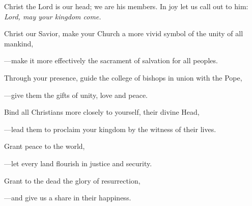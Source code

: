 \intercessions\indent

\begin{hangpar}

Christ the Lord is our head; we are his members. In joy let us call out to him:\\
\emph{Lord, may your kingdom come.}

\medskip Christ our Savior, make your Church a more vivid symbol of the unity of all mankind,

{\color{red}---\thinspace}make it more effectively the sacrament of salvation for all peoples.

\medskip Through your presence, guide the college of bishops in union with the Pope,

{\color{red}---\thinspace}give them the gifts of unity, love and peace.

\medskip Bind all Christians more closely to yourself, their divine Head,

{\color{red}---\thinspace}lead them to proclaim your kingdom by the witness of their lives.

\medskip Grant peace to the world,

{\color{red}---\thinspace}let every land flourish in justice and security.

\medskip Grant to the dead the glory of resurrection,

{\color{red}---\thinspace}and give us a share in their happiness.

\end{hangpar}

